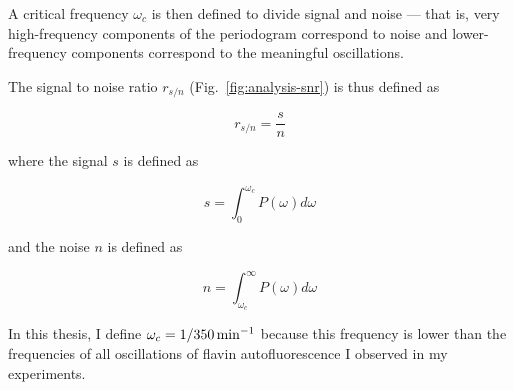 A critical frequency $\omega_{c}$ is then defined to divide signal and noise --- that is, very high-frequency components of the periodogram correspond to noise and lower-frequency components correspond to the meaningful oscillations.

The signal to noise ratio $r_{s/n}$ (Fig.\ \ref{fig:analysis-snr}) is thus defined as

\begin{equation}
  r_{s/n} = \frac{s}{n}
  \label{eq:snr}
\end{equation}

where the signal $s$ is defined as

\begin{equation}
  s = \int_{0}^{\omega_{c}} P(\omega) d\omega
  \label{eq:signal}
\end{equation}

and the noise $n$ is defined as

\begin{equation}
  n = \int_{\omega_{c}}^{\infty} P(\omega) d\omega
  \label{eq:noise}
\end{equation}

In this thesis, I define $\omega_{c} = \SI[parse-numbers=false]{1/350}{\minute^{-1}}$ because this frequency is lower than the frequencies of all oscillations of flavin autofluorescence I observed in my experiments.


